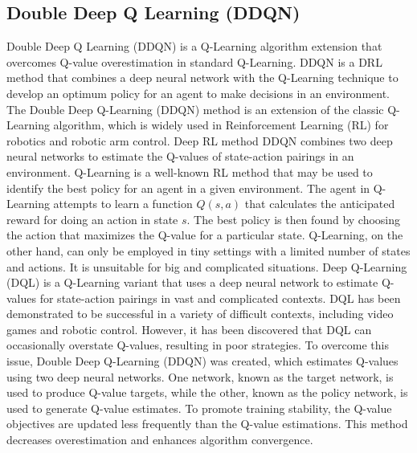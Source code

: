 \documentclass[12pt,oneside]{article}
\begin{document}
\subsection{Double Deep Q Learning (DDQN)}\label{foundations:ddqn}
Double Deep Q Learning (DDQN) is a Q-Learning algorithm extension that overcomes Q-value overestimation in standard Q-Learning. DDQN is a DRL method that combines a deep neural network with the Q-Learning technique to develop an optimum policy for an agent to make decisions in an environment.
The Double Deep Q-Learning (DDQN) method is an extension of the classic Q-Learning algorithm, which is widely used in Reinforcement Learning (RL) for robotics and robotic arm control. Deep RL method DDQN combines two deep neural networks to estimate the Q-values of state-action pairings in an environment.
Q-Learning is a well-known RL method that may be used to identify the best policy for an agent in a given environment. The agent in Q-Learning attempts to learn a function $Q(s, a)$ that calculates the anticipated reward for doing an action in state $s$. The best policy is then found by choosing the action that maximizes the Q-value for a particular state. Q-Learning, on the other hand, can only be employed in tiny settings with a limited number of states and actions. It is unsuitable for big and complicated situations.
Deep Q-Learning (DQL) is a Q-Learning variant that uses a deep neural network to estimate Q-values for state-action pairings in vast and complicated contexts. DQL has been demonstrated to be successful in a variety of difficult contexts, including video games and robotic control. However, it has been discovered that DQL can occasionally overstate Q-values, resulting in poor strategies.
To overcome this issue, Double Deep Q-Learning (DDQN) was created, which estimates Q-values using two deep neural networks. One network, known as the target network, is used to produce Q-value targets, while the other, known as the policy network, is used to generate Q-value estimates. To promote training stability, the Q-value objectives are updated less frequently than the Q-value estimations. This method decreases overestimation and enhances algorithm convergence.
\end{document}
